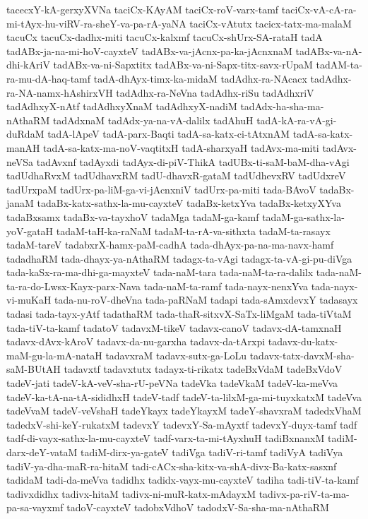 {tacecxY-kA-gerxyXVNa
taciCx-KAyAM
taciCx-roV-varx-tamf
taciCx-vA-cA-ra-mi-tAyx-hu-viRV-ra-sheY-va-pa-rA-yaNA
taciCx-vAtutx
tacicx-tatx-ma-malaM
tacuCx
tacuCx-dadhx-miti
tacuCx-kalxmf
tacuCx-shUrx-SA-rataH
tadA
tadABx-ja-na-mi-hoV-cayxteV
tadABx-va-jAcnx-pa-ka-jAcnxnaM
tadABx-va-nA-dhi-kAriV
tadABx-va-ni-Sapxtitx
tadABx-va-ni-Sapx-titx-savx-rUpaM
tadAM-ta-ra-mu-dA-haq-tamf
tadA-dhAyx-timx-ka-midaM
tadAdhx-ra-NAcacx
tadAdhx-ra-NA-namx-hAshirxVH
tadAdhx-ra-NeVna
tadAdhx-riSu
tadAdhxriV
tadAdhxyX-nAtf
tadAdhxyXnaM
tadAdhxyX-nadiM
tadAdx-ha-sha-ma-nAthaRM
tadAdxnaM
tadAdx-ya-na-vA-dalilx
tadAhuH
tadA-kA-ra-vA-gi-duRdaM
tadA-lApeV
tadA-parx-Baqti
tadA-sa-katx-ci-tAtxnAM
tadA-sa-katx-manAH
tadA-sa-katx-ma-noV-vaqtitxH
tadA-sharxyaH
tadAvx-ma-miti
tadAvx-neVSa
tadAvxnf
tadAyxdi
tadAyx-di-piV-ThikA
tadUBx-ti-saM-baM-dha-vAgi
tadUdhaRvxM
tadUdhavxRM
tadU-dhavxR-gataM
tadUdhevxRV
tadUdxreV
tadUrxpaM
tadUrx-pa-liM-ga-vi-jAcnxniV
tadUrx-pa-miti
tada-BAvoV
tadaBx-janaM
tadaBx-katx-sathx-la-mu-cayxteV
tadaBx-ketxYva
tadaBx-ketxyXYva
tadaBxsamx
tadaBx-va-tayxhoV
tadaMga
tadaM-ga-kamf
tadaM-ga-sathx-la-yoV-gataH
tadaM-taH-ka-raNaM
tadaM-ta-rA-va-sithxta
tadaM-ta-rasayx
tadaM-tareV
tadabxrX-hamx-paM-cadhA
tada-dhAyx-pa-na-ma-navx-hamf
tadadhaRM
tada-dhayx-ya-nAthaRM
tadagx-ta-vAgi
tadagx-ta-vA-gi-pu-diVga
tada-kaSx-ra-ma-dhi-ga-mayxteV
tada-naM-tara
tada-naM-ta-ra-dalilx
tada-naM-ta-ra-do-Lwsx-Kayx-parx-Nava
tada-naM-ta-ramf
tada-nayx-nenxYva
tada-nayx-vi-muKaH
tada-nu-roV-dheVna
tada-paRNaM
tadapi
tada-sAmxdevxY
tadasayx
tadasi
tada-tayx-yAtf
tadathaRM
tada-thaR-sitxvX-SaTx-liMgaM
tada-tiVtaM
tada-tiV-ta-kamf
tadatoV
tadavxM-tikeV
tadavx-canoV
tadavx-dA-tamxnaH
tadavx-dAvx-kAroV
tadavx-da-nu-garxha
tadavx-da-tArxpi
tadavx-du-katx-maM-gu-la-mA-nataH
tadavxraM
tadavx-sutx-ga-LoLu
tadavx-tatx-davxM-sha-saM-BUtAH
tadavxtf
tadavxtutx
tadayx-ti-rikatx
tadeBxVdaM
tadeBxVdoV
tadeV-jati
tadeV-kA-veV-sha-rU-peVNa
tadeVka
tadeVkaM
tadeV-ka-meVva
tadeV-ka-tA-na-tA-sididhxH
tadeV-tadf
tadeV-ta-lilxM-ga-mi-tuyxkatxM
tadeVva
tadeVvaM
tadeV-veVshaH
tadeYkayx
tadeYkayxM
tadeY-shavxraM
tadedxVhaM
tadedxV-shi-keY-rukatxM
tadevxY
tadevxY-Sa-mAyxtf
tadevxY-duyx-tamf
tadf
tadf-di-vayx-sathx-la-mu-cayxteV
tadf-varx-ta-mi-tAyxhuH
tadiBxnanxM
tadiM-darx-deY-vataM
tadiM-dirx-ya-gateV
tadiVga
tadiV-ri-tamf
tadiVyA
tadiVya
tadiV-ya-dha-maR-ra-hitaM
tadi-cACx-sha-kitx-va-shA-divx-Ba-katx-sasxnf
tadidaM
tadi-da-meVva
tadidhx
tadidx-vayx-mu-cayxteV
tadiha
tadi-tiV-ta-kamf
tadivxdidhx
tadivx-hitaM
tadivx-ni-muR-katx-mAdayxM
tadivx-pa-riV-ta-ma-pa-sa-vayxmf
tadoV-cayxteV
tadobxVdhoV
tadodxV-Sa-sha-ma-nAthaRM
}
